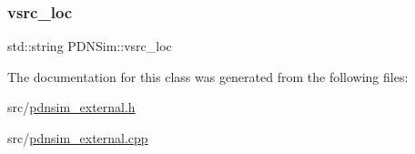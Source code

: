 \mbox{\label{classPDNSim_a90890b7b495942e15b4ded550acae4ee}} 
\subsubsection{\texorpdfstring{vsrc\+\_\+loc}{vsrc\_loc}}
{\footnotesize\ttfamily std\+::string P\+D\+N\+Sim\+::vsrc\+\_\+loc}



The documentation for this class was generated from the following files\+:\begin{DoxyCompactItemize}
\item 
src/\hyperlink{pdnsim__external_8h}{pdnsim\+\_\+external.\+h}\item 
src/\hyperlink{pdnsim__external_8cpp}{pdnsim\+\_\+external.\+cpp}\end{DoxyCompactItemize}
